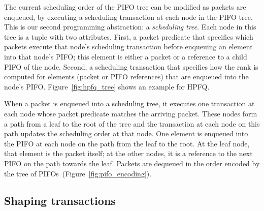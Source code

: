 The current scheduling order of the PIFO tree can be modified as
packets are enqueued, by executing a scheduling transaction at each
node in the PIFO tree. This is our second programming abstraction: a
{\em scheduling tree}.  Each node in this tree is a tuple with two
attributes. First, a packet predicate that specifies which packets
execute that node's scheduling transaction before enqueuing an
element into that node's PIFO; this element is either a packet or a
reference to a child PIFO of the node.  Second, a scheduling
transaction that specifies how the rank is computed for elements
(packet or PIFO references) that are enqueued into the node's
PIFO. Figure~\ref{fig:hpfq_tree} shows an example for HPFQ.

When a packet is enqueued into a scheduling tree, it executes one
transaction at each node whose packet predicate matches the arriving
packet. These nodes form a path from a leaf to the root of the tree
and the transaction at each node on this path updates the scheduling
order at that node. One element is enqueued into the PIFO at each node
on the path from the leaf to the root. At the leaf node, that element
is the packet itself; at the other nodes, it is a reference to the
next PIFO on the path towards the leaf. Packets are dequeued in the
order encoded by the tree of PIFOs~(Figure~\ref{fig:pifo_encoding}).

\subsection{Shaping transactions}
\label{ss:hshaping}

